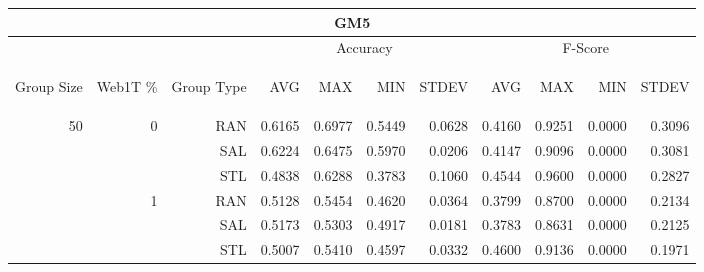 \begin{center}
\begin{table}[htbp]
\begin{tabular}{ | r | r | r | r | r | r | r | r | r | r | r |}
\hline
\multicolumn{11}{|c|}{GM5}\\
\hline
 & & & \multicolumn{4}{|c|}{Accuracy} & \multicolumn{4}{|c|}{F-Score}\\ \cline{4-11}
\begin{sideways}Group Size\end{sideways} & \begin{sideways}Web1T \%\end{sideways} & \begin{sideways}Group Type\end{sideways} & \begin{sideways}AVG\end{sideways} & \begin{sideways}MAX\end{sideways} & \begin{sideways}MIN\end{sideways} & \begin{sideways}STDEV\end{sideways} & \begin{sideways}AVG\end{sideways} & \begin{sideways}MAX\end{sideways} & \begin{sideways}MIN\end{sideways} & \begin{sideways}STDEV\end{sideways}\\
\hline
\multirow{18}{*}{50}
 & \multirow{3}{*}{0} & RAN & 0.6165 & 0.6977 & 0.5449 & 0.0628 & 0.4160 & 0.9251 & 0.0000 & 0.3096\\ \cline{3-11}
 &   & SAL & 0.6224 & 0.6475 & 0.5970 & 0.0206 & 0.4147 & 0.9096 & 0.0000 & 0.3081\\ \cline{3-11}
 &   & STL & 0.4838 & 0.6288 & 0.3783 & 0.1060 & 0.4544 & 0.9600 & 0.0000 & 0.2827\\ \cline{2-11}
 & \multirow{3}{*}{1} & RAN & 0.5128 & 0.5454 & 0.4620 & 0.0364 & 0.3799 & 0.8700 & 0.0000 & 0.2134\\ \cline{3-11}
 &   & SAL & 0.5173 & 0.5303 & 0.4917 & 0.0181 & 0.3783 & 0.8631 & 0.0000 & 0.2125\\ \cline{3-11}
 &   & STL & 0.5007 & 0.5410 & 0.4597 & 0.0332 & 0.4600 & 0.9136 & 0.0000 & 0.1971\\ \cline{2-11}

\end{tabular}
\end{table}
\end{center}
